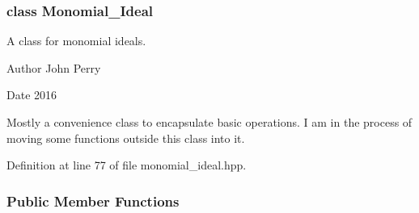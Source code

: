 \subsubsection{class Monomial\+\_\+\+Ideal}
A class for monomial ideals. 

\begin{DoxyAuthor}{Author}
John Perry 
\end{DoxyAuthor}
\begin{DoxyDate}{Date}
2016
\end{DoxyDate}
Mostly a convenience class to encapsulate basic operations. I am in the process of moving some functions outside this class into it. 

Definition at line 77 of file monomial\+\_\+ideal.\+hpp.

\subsubsection*{Public Member Functions}
